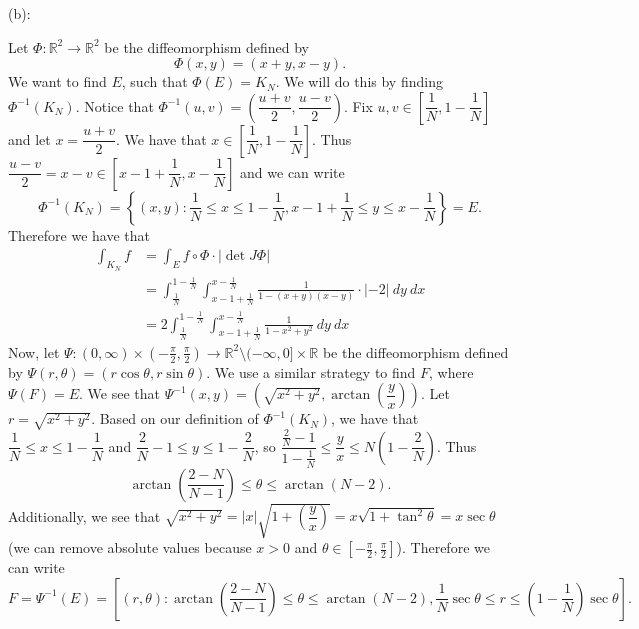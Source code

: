 \documentclass{../../../tex-setup/eh-homework}
\begin{document}
\begin{question}{38}
    (b):

    Let \(\Phi : \mathbb{R}^2 \to \mathbb{R}^2\) be the diffeomorphism defined by
    \[
        \Phi (x,y) = (x+y, x-y).
    \]
    We want to find \(E\), such that \(\Phi (E) = K_N\). We will do this by finding \(\Phi ^{-1}(K_N)\). Notice that \(\Phi ^{-1}(u,v) = \left( \dfrac{u+v}{2}, \dfrac{u-v}{2} \right)\). Fix \(u,v \in \left[ \dfrac{1}{N}, 1- \dfrac{1}{N} \right] \) and let \(x = \dfrac{u+v}{2}\). We have that \(x \in \left[ \dfrac{1}{N}, 1 - \dfrac{1}{N}\right]\). Thus \(\dfrac{u - v}{2} = x - v \in \left[ x - 1 + \dfrac{1}{N}, x - \dfrac{1}{N} \right]\) and we can write
    \[
        \Phi ^{-1}(K_N) = \left\{ (x,y) : \frac{1}{N} \leq x \leq 1 - \frac{1}{N}, x - 1 + \frac{1}{N} \leq y \leq x - \frac{1}{N}\right\} = E.
    \]
    Therefore we have that
    \begin{align*}
        \int _{K_N} f &= \int _E f \circ \Phi \cdot \left\vert \det J \Phi \right\vert \\
        &= \int _{\frac{1}{N}}^{1-\frac{1}{N}} \int _{x - 1 + \frac{1}{N}}^{x-\frac{1}{N}} \frac{1}{1 - (x + y)(x-y)}\cdot | -2 |\ dy\ dx \\
        &= 2\int _{\frac{1}{N}}^{1-\frac{1}{N}} \int _{x - 1 + \frac{1}{N}}^{x-\frac{1}{N}} \frac{1}{1 - x^2 + y^2}\ dy\ dx
    \end{align*}
    Now, let \(\Psi : (0, \infty)\times (-\frac{\pi}{2}, \frac{\pi}{2}) \to \mathbb{R}^2 \setminus (-\infty , 0] \times \mathbb{R}\) be the diffeomorphism defined by \(\Psi (r,\theta) = (r\cos \theta , r\sin \theta)\). We use a similar strategy to find \(F\), where \(\Psi (F) = E\). We see that \(\Psi ^{-1}(x,y) = \left( \sqrt{x^2 + y^2} , \arctan \left( \dfrac{y}{x} \right) \right)\). Let \(r = \sqrt{x^2 + y^2}\). Based on our definition of \(\Phi ^{-1}(K_N)\), we have that \(\dfrac{1}{N} \leq x \leq 1 - \dfrac{1}{N}\) and \(\dfrac{2}{N} - 1 \leq y \leq 1 - \dfrac{2}{N}\), so \(\dfrac{\frac{2}{N} - 1}{1 - \frac{1}{N}} \leq \dfrac{y}{x} \leq N\left(1-\dfrac{2}{N}\right)\). Thus
    \[
        \arctan \left( \frac{2-N}{N-1} \right) \leq \theta \leq \arctan (N-2).
    \]
    Additionally, we see that \(\sqrt{x^2 + y^2} = |x|\sqrt{1 + \left(\dfrac{y}{x}\right)} = x\sqrt{1 + \tan^2 \theta} = x\sec \theta\) (we can remove absolute values because \(x > 0\) and \(\theta \in \left[ -\frac{\pi}{2}, \frac{\pi}{2} \right] \)). Therefore we can write
    \[
        F = \Psi ^{-1}(E) = \left[ (r, \theta) : \arctan \left( \frac{2-N}{N-1} \right) \leq \theta \leq \arctan (N-2), \frac{1}{N}\sec \theta \leq r \leq \left( 1-\frac{1}{N} \right)\sec \theta \right].
\]
\end{question}
\end{document}
